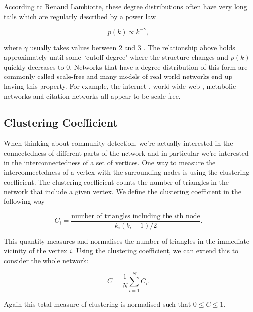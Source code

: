 According to Renaud Lambiotte, these degree distributions often have very long tails which are regularly described by a power law

$$ p(k) \propto k^{-\gamma}, $$

\noindent
where $\gamma$ usually takes values between $2$ and $3$ \cite[16]{oxford:renaud_notes}. The relationship above holds approximately until some ``cutoff degree" where the structure changes and $p(k)$ quickly decreases to $0$. Networks that have a degree distribution of this form are commonly called scale-free and many models of real world networks end up having this property. For example, the internet \cite{PhysRevE.65.066130}, world wide web \cite{BARABASI200069}, metabolic networks \cite{Jeong2000} and citation networks \cite{Redner1998} all appear to be scale-free.

\subsection{Clustering Coefficient}
When thinking about community detection, we're actually interested in the connectedness of different parts of the network and in particular we're interested in the interconnectedness of a set of vertices. One way to measure the interconnectedness of a vertex with the surrounding nodes is using the clustering coefficient. The clustering coefficient counts the number of triangles in the network that include a given vertex. We define the clustering coefficient in the following way

$$ C_i = \frac{\text{number of triangles including the }i\text{th node}}{k_i(k_i-1)/2}. $$

This quantity measures and normalises the number of triangles in the immediate vicinity of the vertex $i$. Using the clustering coefficient, we can extend this to consider the whole network:

$$ C = \frac{1}{N}\sum_{i=1}^NC_i. $$

\noindent
Again this total measure of clustering is normalised such that $0 \leq C \leq 1$.

